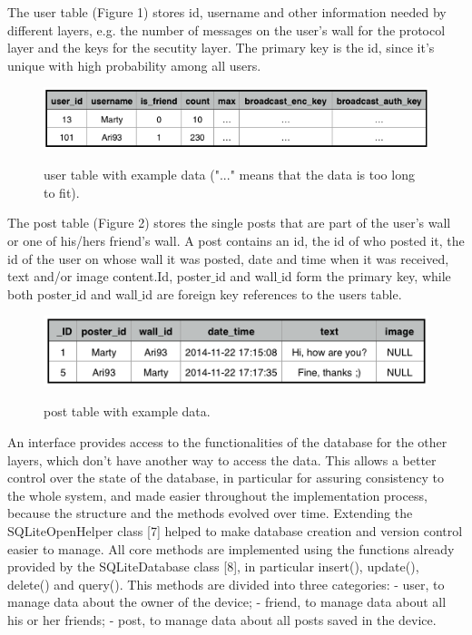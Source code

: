 \documentclass{report}
\newcommand{\lfig}[1]{\label{fig:#1}}
\begin{document}
The user table (Figure 1) stores id, username and other information needed by different layers, e.g. the number of messages on the user's wall for the protocol layer and the keys for the secutity layer. The primary key is the id, since it's unique with high probability among all users.

\begin{figure}[H]
	
	
	\centering
    \includegraphics[width=\columnwidth]{users_table_example.png}
    \lfig{users_table_example}
    \vspace{-5mm} %
	\caption{user table with example data ("..." means that the data is too long to fit).}
\end{figure}

The post table (Figure 2) stores the single posts that are part of the user's wall or one of his/hers friend's wall. 
A post contains an id, the id of who posted it, the id of the user on whose wall it was posted, date and time when it was received, text and/or image content.Id, poster$\_$id and wall$\_$id form the primary key, while both poster$\_$id and wall$\_$id are foreign key references to the users table.

\begin{figure}[H]
	\centering
    \includegraphics[width=\columnwidth]{post_table_example.png}
    \lfig{post_table_example}
    \vspace{-5mm} %
	\caption{post table with example data.}
\end{figure}


An interface provides access to the functionalities of the database for the other layers, which don't have another way to access the data. This allows a better control over the state of the database, in particular for assuring consistency to the whole system, and made easier throughout the implementation process, because the structure and the methods evolved over time.
Extending the SQLiteOpenHelper class [7] helped to make database creation and version control easier to manage.
All core methods are implemented using the functions already provided by the SQLiteDatabase class [8], in particular insert(), update(), delete() and query(). This methods are divided into three categories:
- user, to manage data about the owner of the device;
- friend, to manage data about all his or her friends;
- post, to manage data about all posts saved in the device.
\end{document}
